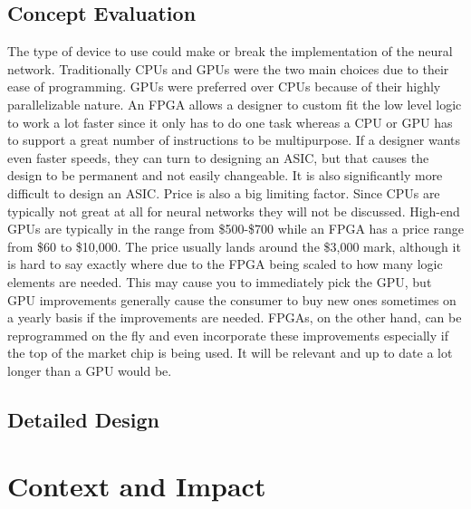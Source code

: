 \documentclass[12pt,titlepage]{article}
\begin{document}
\subsection{Concept Evaluation}
The type of device to use could make or break the implementation of the neural network. Traditionally CPUs and GPUs were the two main choices due to
their ease of programming. GPUs were preferred over CPUs because of their highly parallelizable nature. An FPGA allows a designer to custom fit the
low level logic to work a lot faster since it only has to do one task whereas a CPU or GPU has to support a great number of instructions to be
multipurpose. If a designer wants even faster speeds, they can turn to designing an ASIC, but that causes the design to be permanent and not easily
changeable. It is also significantly more difficult to design an ASIC. Price is also a big limiting factor. Since CPUs are typically not great at all
for neural networks they will not be discussed. High-end GPUs are typically in the range from \$500-\$700 while an FPGA has a price range from \$60 to
\$10,000. The price usually lands around the \$3,000 mark, although it is hard to say exactly where due to the FPGA being scaled to how many logic elements
are needed. This may cause you to immediately pick the GPU, but GPU improvements generally cause the consumer to buy new ones sometimes on a yearly basis
if the improvements are needed. FPGAs, on the other hand, can be reprogrammed on the fly and even incorporate these improvements especially if the top of
the market chip is being used. It will be relevant and up to date a lot longer than a GPU would be.

\subsection{Detailed Design}



\section{Context and Impact}
\end{document}

